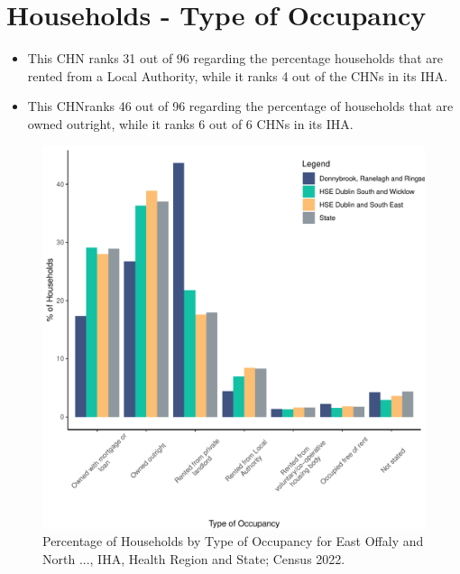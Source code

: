 \documentclass{article}
\begin{document}
\section{Households - Type of Occupancy}\label{sect:Households}
\begin{itemize}
\item This CHN ranks  31 out of 96 regarding the percentage households that are rented from a Local Authority, while it ranks  4 out of the CHNs in its IHA. 
\item This CHNranks  46 out of 96 regarding the percentage of households that are owned outright, while it ranks   6 out of 6 CHNs in its IHA.
\end{itemize}
\begin{figure}[H]
	\centering
	\includegraphics[width = 140mm]{../figures/HouseholdsED.pdf}
	\caption{Percentage of Households by Type of Occupancy for East Offaly and North ..., IHA, Health Region and State; Census 2022.}
	\label{fig:vbnv}
	\end{figure}
\end{document}
